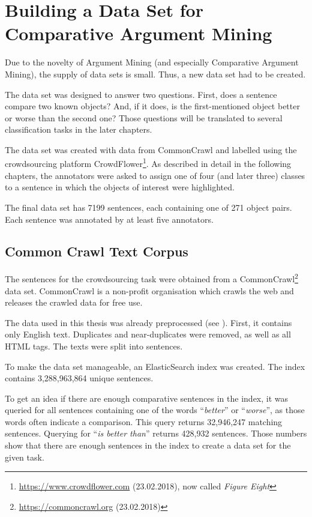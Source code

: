 \FloatBarrier
\chapter{Building a Data Set for Comparative Argument Mining}
\label{sec:prestudy}
Due to the novelty of Argument Mining (and especially Comparative Argument Mining), the supply of data sets is small. Thus, a new data set had to be created.

The data set was designed to answer two questions. First, does a sentence compare two known objects? And, if it does, is the first-mentioned object better or worse than the second one? Those questions will be translated to several classification tasks in the later chapters.

The data set was created with data from CommonCrawl and labelled using the crowdsourcing platform CrowdFlower\footnote{\url{https://www.crowdflower.com} (23.02.2018), now called \emph{Figure Eight}}. As described in detail in the following chapters, the annotators were asked to assign one of four (and later three) classes to a sentence in which the objects of interest were highlighted.

The final data set has 7199 sentences, each containing one of 271 object pairs. Each sentence was annotated by at least five annotators.

\section{Common Crawl Text Corpus}
The sentences for the crowdsourcing task were obtained from a CommonCrawl\footnote{\url{https://commoncrawl.org} (23.02.2018)} data set. CommonCrawl is a non-profit organisation which crawls the web and releases the crawled data for free use.

The data used in this thesis was already preprocessed (see \cite{Panchenko:2017aa}). First, it contains only English text. Duplicates and near-duplicates were removed, as well as all HTML tags. The texts were split into sentences.

To make the data set manageable, an ElasticSearch index was created. The index contains 3,288,963,864 unique sentences.

To get an idea if there are enough comparative sentences in the index, it was queried for all sentences containing one of the words \enquote{\emph{better}} or \enquote{\emph{worse}},  as those words often indicate a comparison. This query returns 32,946,247 matching sentences. Querying for \enquote{\emph{is better than}} returns 428,932 sentences. Those numbers show that there are enough sentences in the index to create a data set for the given task.


